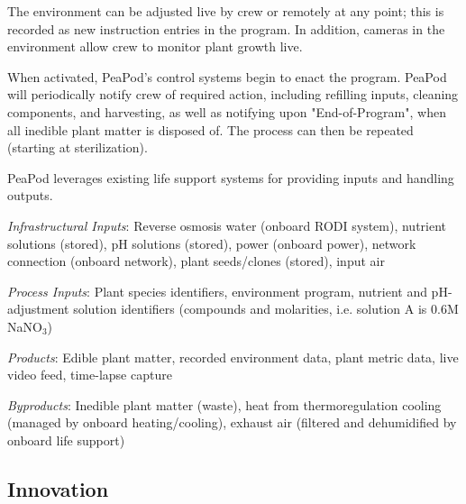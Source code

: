\documentclass{report}
\begin{document}
The environment can be adjusted live by crew or remotely at any point; this is recorded as new instruction entries in the program. In addition, cameras in the environment allow crew to monitor plant growth live.

When activated, PeaPod's control systems begin to enact the program. PeaPod will periodically notify crew of required action, including refilling inputs, cleaning components, and harvesting, as well as notifying upon "End-of-Program", when all inedible plant matter is disposed of. The process can then be repeated (starting at sterilization).

PeaPod leverages existing life support systems for providing inputs and handling outputs.

\textit{Infrastructural Inputs}: Reverse osmosis water (onboard RODI system), nutrient solutions (stored), pH solutions (stored), power (onboard power), network connection (onboard network), plant seeds/clones (stored), input air

\textit{Process Inputs}: Plant species identifiers, environment program, nutrient and pH-adjustment solution identifiers (compounds and molarities, i.e. solution A is 0.6M NaNO${}_3$)

\textit{Products}: Edible plant matter, recorded environment data, plant metric data, live video feed, time-lapse capture

\textit{Byproducts}: Inedible plant matter (waste), heat from thermoregulation cooling (managed by onboard heating/cooling), exhaust air (filtered and dehumidified by onboard life support)



\subsection{Innovation}
\label{sec:innovation}
\end{document}
